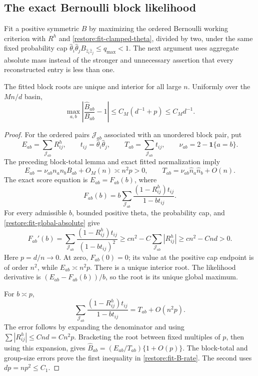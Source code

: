 \subsection{The exact Bernoulli block likelihood}

Fit a positive symmetric $B$ by maximizing the ordered Bernoulli
working criterion with $R^h$ and \eqref{restore:fit-clamped-theta},
divided by two, under the same fixed probability cap
$\widehat\theta_i\widehat\theta_jB_{\widehat z_i\widehat z_j}
\le q_{\max}<1$.
The next argument uses aggregate absolute mass instead of the stronger
and unnecessary assertion that every reconstructed entry is less than one.

\begin{lemma}
\label{restore:fit-block-root}
The fitted block roots are unique and interior for all large $n$.
Uniformly over the $Mn/d$ basin,
\begin{equation}\label{restore:fit-B-rate}
 \max_{a,b}\left|\frac{\widehat B_{ab}}{B_{ab}}-1\right|
       \le C_M(d^{-1}+p)\le C_Md^{-1}.
\end{equation}
\end{lemma}

\begin{proof}
For the ordered pairs $\mathcal J_{ab}$ associated with an unordered
block pair, put
\[
 E_{ab}=\sum_{\mathcal J_{ab}}R^h_{ij},\qquad
 t_{ij}=\widehat\theta_i\widehat\theta_j,\qquad
 T_{ab}=\sum_{\mathcal J_{ab}}t_{ij},\qquad
 \nu_{ab}=2-\mathbf1\{a=b\}.
\]
The preceding block-total lemma and exact fitted normalization imply
\[
 E_{ab}=\nu_{ab}n_an_bB_{ab}+O_M(n)\asymp n^2p>0,\qquad
 T_{ab}=\nu_{ab}\widehat n_a\widehat n_b+O(n).
\]
The exact score equation is $E_{ab}=F_{ab}(b)$, where
\[
 F_{ab}(b)=b\sum_{\mathcal J_{ab}}
              \frac{(1-R^h_{ij})t_{ij}}{1-bt_{ij}}.
\]
For every admissible $b$, bounded positive theta, the probability cap,
and \eqref{restore:fit-global-absolute} give
\[
 F_{ab}'(b)
 =\sum_{\mathcal J_{ab}}
          \frac{(1-R^h_{ij})t_{ij}}{(1-bt_{ij})^2}
 \ge cn^2-C\sum_{\mathcal J_{ab}}|R^h_{ij}|
 \ge cn^2-Cnd>0.
\]
Here $p=d/n\to0$. At zero, $F_{ab}(0)=0$; its value at the
positive cap endpoint is of order $n^2$, while $E_{ab}\asymp n^2p$.
There is a unique interior root. The likelihood derivative is
$(E_{ab}-F_{ab}(b))/b$, so the root is its unique global maximum.

For $b\asymp p$,
\[
 \sum_{\mathcal J_{ab}}
       \frac{(1-R^h_{ij})t_{ij}}{1-bt_{ij}}
       =T_{ab}+O(n^2p).
\]
The error follows by expanding the denominator and using
$\sum|R^h_{ij}|\le Cnd=Cn^2p$.
Bracketing the root between fixed multiples of $p$, then using this
expansion, gives
$\widehat B_{ab}=(E_{ab}/T_{ab})\{1+O(p)\}$.
The block-total and group-size errors prove the first inequality in
\eqref{restore:fit-B-rate}. The second uses $dp=np^2\le C_1$.
\end{proof}

